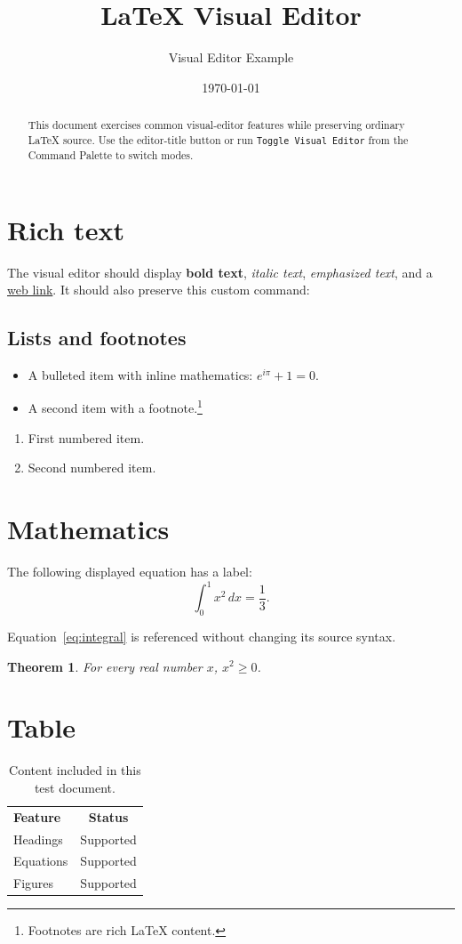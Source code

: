 \documentclass{article}
\title{LaTeX Visual Editor}
\author{Visual Editor Example}
\date{\today}
\newtheorem{theorem}{Theorem}
\begin{document}
\maketitle

\begin{abstract}
This document exercises common visual-editor features while preserving ordinary
LaTeX source. Use the editor-title button or run
\texttt{Toggle Visual Editor} from the Command Palette to switch modes.
\end{abstract}

\section{Rich text}
\label{sec:rich-text}

The visual editor should display \textbf{bold text}, \textit{italic text}, \emph{emphasized text}, and a \href{https://www.latex-project.org/}{web link}.
It should also preserve this custom command:

\subsection{Lists and footnotes}

\begin{itemize}
  \item A bulleted item with inline mathematics: \(e^{i\pi} + 1 = 0\).
  \item A second item with a footnote.\footnote{Footnotes are rich LaTeX content.}
\end{itemize}

\begin{enumerate}
  \item First numbered item.
  \item Second numbered item.
\end{enumerate}

\section{Mathematics}

The following displayed equation has a label:
\begin{equation}
  \int_{0}^{1} x^2\,dx = \frac{1}{3}.
  \label{eq:integral}
\end{equation}

Equation~\ref{eq:integral} is referenced without changing its source syntax.

\begin{theorem}
For every real number \(x\), \(x^2 \geq 0\).
\end{theorem}

\section{Table}

\begin{table}[ht]
  \centering
  \begin{tabular}{lc}
    \textbf{Feature} & \textbf{Status} \\
    Headings & Supported \\
    Equations & Supported \\
    Figures & Supported \end{tabular}
  \caption{Content included in this test document.}
  \label{tab:features}
\end{table}
\end{document}
